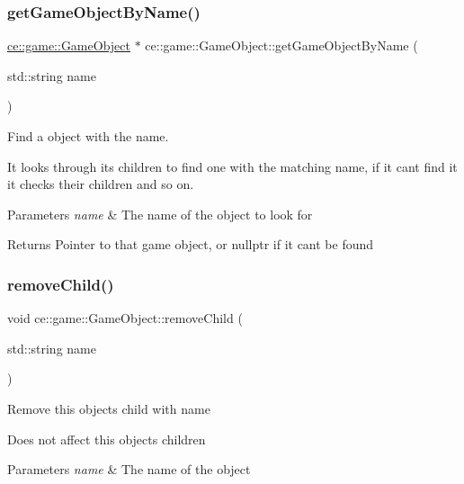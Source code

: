 \subsubsection{\texorpdfstring{get\+Game\+Object\+By\+Name()}{getGameObjectByName()}}
{\footnotesize\ttfamily \hyperlink{classce_1_1game_1_1_game_object}{ce\+::game\+::\+Game\+Object} $\ast$ ce\+::game\+::\+Game\+Object\+::get\+Game\+Object\+By\+Name (\begin{DoxyParamCaption}\item[{std\+::string}]{name }\end{DoxyParamCaption})}



Find a object with the name. 

It looks through it\textquotesingle{}s children to find one with the matching name, if it can\textquotesingle{}t find it it checks their children and so on.


\begin{DoxyParams}{Parameters}
{\em name} & The name of the object to look for \\
\hline
\end{DoxyParams}
\begin{DoxyReturn}{Returns}
Pointer to that game object, or nullptr if it can\textquotesingle{}t be found 
\end{DoxyReturn}
\mbox{\label{classce_1_1game_1_1_game_object_ab00a9e4dcbadfa208df56e3cbed9e8d2}} 
\subsubsection{\texorpdfstring{remove\+Child()}{removeChild()}}
{\footnotesize\ttfamily void ce\+::game\+::\+Game\+Object\+::remove\+Child (\begin{DoxyParamCaption}\item[{std\+::string}]{name }\end{DoxyParamCaption})}

Remove this objects child with name

Does not affect this objects children


\begin{DoxyParams}{Parameters}
{\em name} & The name of the object \\
\hline
\end{DoxyParams}
\mbox{\label{classce_1_1game_1_1_game_object_ab700981d509605a9b1bef436207e5d54}} 
